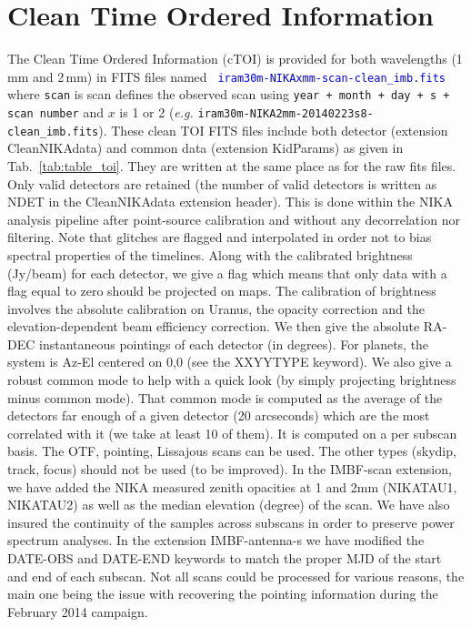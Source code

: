 \documentclass[a4paper,10pt]{article}
\begin{document}
\section{Clean Time Ordered Information}
The Clean Time Ordered Information (cTOI) is provided for both wavelengths (1
mm and 2\,mm) in FITS files named \textcolor{blue}{{\tt
    iram30m-NIKAxmm-scan-clean\_imb.fits}} where {\tt scan} is scan defines
the observed scan using {\tt year + month + day + s + scan number} and $x$ is
1 or 2 ({\it e.g.} {\tt iram30m-NIKA2mm-20140223s8-clean\_imb.fits}). These
clean TOI FITS files include both detector (extension CleanNIKAdata) and
common data (extension KidParams) as given in Tab.~\ref{tab:table_toi}. They
are written at the same place as for the raw fits files. Only valid detectors
are retained (the number of valid detectors is written as NDET in the
CleanNIKAdata extension header).  This is done within the NIKA analysis
pipeline after point-source calibration and without any decorrelation nor
filtering. Note that glitches are flagged and interpolated in order not to
bias spectral properties of the timelines. Along with the calibrated
brightness (Jy/beam) for each detector, we give a flag which means that only
data with a flag equal to zero should be projected on maps.  The calibration
of brightness involves the absolute calibration on Uranus, the opacity
correction and the elevation-dependent beam efficiency correction. We then
give the absolute RA-DEC instantaneous pointings of each detector (in
degrees).  For planets, the system is Az-El centered on 0,0 (see the XXYYTYPE
keyword). We also give a robust common mode to help with a quick look (by
simply projecting brightness minus common mode). That common mode is computed
as the average of the detectors far enough of a given detector (20 arcseconds)
which are the most correlated with it (we take at least 10 of them). It is
computed on a per subscan basis. The OTF, pointing, Lissajous scans can be
used. The other types (skydip, track, focus) should not be used (to be
improved).  In the IMBF-scan extension, we have added the NIKA measured zenith
opacities at 1 and 2mm (NIKATAU1, NIKATAU2) as well as the median elevation
(degree) of the scan. We have also insured the continuity of the samples
across subscans in order to preserve power spectrum analyses. In the extension
IMBF-antenna-s we have modified the DATE-OBS and DATE-END keywords to match
the proper MJD of the start and end of each subscan. Not all scans could be
processed for various reasons, the main one being the issue with recovering
the pointing information during the February 2014 campaign.
\end{document}

